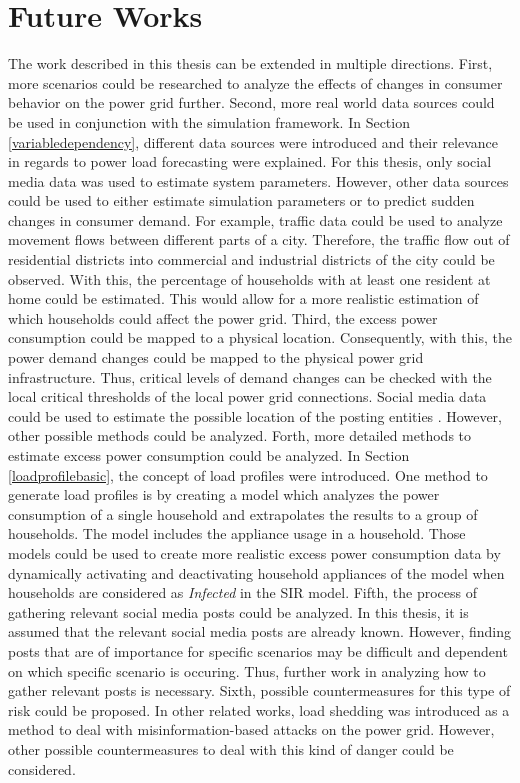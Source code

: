 \section{Future Works}

The work described in this thesis can be extended in multiple
directions. First, more scenarios could be researched 
to analyze the effects of changes in consumer behavior
on the power grid further. Second, more real world 
data sources could be used in conjunction with the 
simulation framework.
In Section \ref{variabledependency}, different data 
sources were introduced and their relevance in regards 
to power load forecasting were explained. For this
thesis, only social media data was used to estimate system 
parameters. However, other data sources could be used
to either estimate simulation parameters or to predict
sudden changes in consumer demand. For example,
traffic data could be used to analyze movement flows 
between different parts of a city. Therefore, the
traffic flow out of residential districts into 
commercial and industrial districts of the city 
could be observed. With this,
the percentage of households with at least one 
resident at home could be estimated. 
This would allow for a more realistic estimation 
of which households could affect the power grid.
Third, the excess power consumption could be mapped
to a physical location. Consequently, with this, 
the power demand changes could be mapped to the 
physical power grid infrastructure. Thus, 
critical levels of demand changes can be 
checked with the local critical thresholds of the
local power grid connections. Social media data could
be used to estimate the possible location of the 
posting entities \cite{jurgens2015geolocation}.
However, other possible methods could be analyzed.
Forth, more detailed methods to estimate excess 
power consumption could be analyzed.
In Section \ref{loadprofilebasic}, the concept 
of load profiles were introduced. One 
method to generate load profiles is by 
creating a model which 
analyzes the power consumption of a single 
household and extrapolates the results to 
a group of households. The model includes 
the appliance usage in a household. 
Those models could be used to create more 
realistic excess power consumption data
by dynamically activating and deactivating
household appliances of the model when 
households are considered as 
\textit{Infected} in the SIR model.
Fifth, the process of gathering relevant social 
media posts could be analyzed. In this thesis,
it is assumed that the relevant social 
media posts are already known. However,
finding posts that are of importance for 
specific scenarios may be difficult and 
dependent on which specific scenario is 
occuring. Thus, further work in analyzing 
how to gather relevant posts is necessary.
Sixth, possible countermeasures for this type 
of risk could be proposed. In other related works,
load shedding was introduced as a method to 
deal with misinformation-based attacks on the power grid.
However, other possible countermeasures to deal with 
this kind of danger could be considered.

